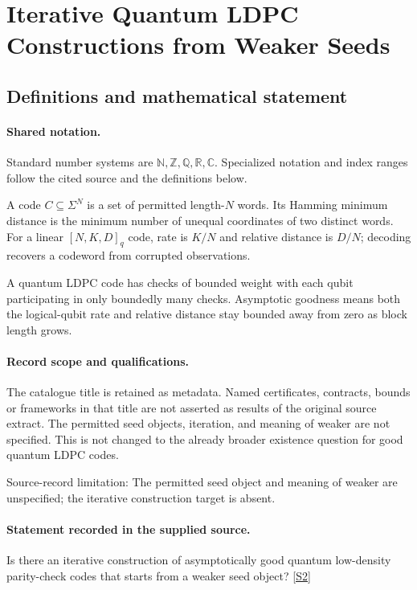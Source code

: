 \documentclass[11pt]{article}
\newcommand{\sref}[2]{\hyperlink{source:#1:#2}{[S#2]}}
\begin{document}
\section{Iterative Quantum LDPC Constructions from Weaker Seeds}\label{statement}

\subsection{Definitions and mathematical statement}

\paragraph{Shared notation.}Standard number systems are $\mathbb N,\mathbb Z,\mathbb Q,\mathbb R,\mathbb C$. Specialized notation and index ranges follow the cited source and the definitions below.


A code $C\subseteq\Sigma^N$ is a set of permitted length-$N$ words. Its Hamming minimum distance is the minimum number of unequal coordinates of two distinct words. For a linear $[N,K,D]_q$ code, rate is $K/N$ and relative distance is $D/N$; decoding recovers a codeword from corrupted observations.

A quantum LDPC code has checks of bounded weight with each qubit participating in only boundedly many checks. Asymptotic goodness means both the logical-qubit rate and relative distance stay bounded away from zero as block length grows.
\paragraph{Record scope and qualifications.}
The catalogue title is retained as metadata. Named certificates, contracts, bounds or frameworks in that title are not asserted as results of the original source extract.
The permitted seed objects, iteration, and meaning of weaker are not specified. This is not changed to the already broader existence question for good quantum LDPC codes.

Source-record limitation: The permitted seed object and meaning of weaker are unspecified; the iterative construction target is absent.
\paragraph{Statement recorded in the supplied source.}
Is there an iterative construction of asymptotically good quantum low-density parity-check codes that starts from a weaker seed object? \sref{statement}{2}
\end{document}
